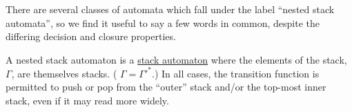 There are several classes of automata which fall under the label ``nested
stack automata'', so we find it useful to say a few words in common, despite
the differing decision and closure properties.

A nested stack automaton is a \hyperref[sec:zoo-str/stack]{stack automaton}
where the elements of the stack, $\Gamma$, are themselves stacks.  (\ie
$\Gamma = \Gamma'^*$.)  In all cases, the transition function is permitted
to push or pop from the ``outer'' stack and/or the top-most inner stack,
even if it may read more widely.
